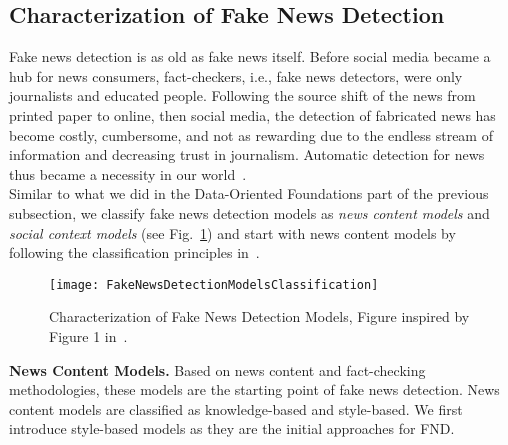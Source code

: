 \subsection{Characterization of Fake News Detection}
\label{subsec:FakeNewsDetection_Characterization}
Fake news detection is as old as fake news itself. Before social media became a hub for news consumers, fact-checkers, i.e., fake news detectors, were only journalists and educated people. Following the source shift of the news from printed paper to online, then social media, the detection of fabricated news has become costly, cumbersome, and not as rewarding due to the endless stream of information and decreasing trust in journalism. Automatic detection for news thus became a necessity in our world~\parencite{NewsInAnOnlineWorld_Chen}.\\
Similar to what we did in the Data-Oriented Foundations part of the previous subsection, we classify fake news detection models as \emph{news content models} and  \emph{social context models} (see Fig.~\ref{fig:FakeNewsDetectionModelsClassification}) and start with news content models by following the classification principles in~\parencite{FakeNewsDetectionOnSocialMediaADataMiningPerspective_Shu}.\\
\begin{figure}
    \centering
    \texttt{[image: FakeNewsDetectionModelsClassification]}
    \caption[Characterization of Fake News Detection Models]{Characterization of Fake News Detection Models, Figure inspired by Figure 1 in~\cite{FakeNewsDetectionOnSocialMediaADataMiningPerspective_Shu}.}
    \label{fig:FakeNewsDetectionModelsClassification}
\end{figure}
\textbf{News Content Models.} Based on news content and fact-checking methodologies, these models are the starting point of fake news detection. News content models are classified as knowledge-based and style-based. We first introduce style-based models as they are the initial approaches for FND.
